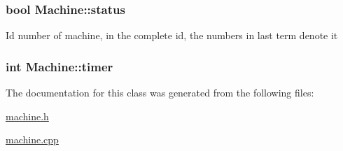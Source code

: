 \subsubsection[{status}]{\setlength{\rightskip}{0pt plus 5cm}bool Machine\+::status\hspace{0.3cm}{\ttfamily [private]}}\label{classMachine_aa2bac9d075b6ceba0c90b063a9f3dd01}
Id number of machine, in the complete id, the numbers in last term denote it \hypertarget{classMachine_a34e0ad8face9abb7206f74f421c4cb59}{}
\subsubsection[{timer}]{\setlength{\rightskip}{0pt plus 5cm}int Machine\+::timer\hspace{0.3cm}{\ttfamily [private]}}\label{classMachine_a34e0ad8face9abb7206f74f421c4cb59}


The documentation for this class was generated from the following files\+:\begin{DoxyCompactItemize}
\item 
\hyperlink{machine_8h}{machine.\+h}\item 
\hyperlink{machine_8cpp}{machine.\+cpp}\end{DoxyCompactItemize}
